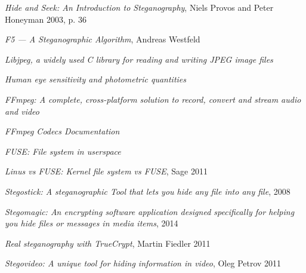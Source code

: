 \documentclass[paper=a4, fontsize=11pt,twoside]{scrartcl}
\numberwithin{table}{section}
\numberwithin{figure}{section}
\numberwithin{algorithm}{section}
\begin{document}
\begin{thebibliography}{1}
 \emph{Hide and Seek: An Introduction to Steganography}, Niels Provos and Peter Honeyman 2003, p. 36\\

 \emph{F5 — A Steganographic Algorithm}, Andreas Westfeld\\

 \emph{Libjpeg, a widely used C library for reading and writing JPEG image files}\\

 \emph{Human eye sensitivity and photometric quantities}\\

 \emph{FFmpeg: A complete, cross-platform solution to record, convert and stream audio and video}\\

 \emph{FFmpeg Codecs Documentation}\\

 \emph{FUSE: File system in userspace}\\

 \emph{Linus vs FUSE: Kernel file system vs FUSE}, Sage 2011\\

 \emph{Stegostick: A steganographic Tool that lets you hide any file into any file}, 2008\\

 \emph{Stegomagic: An encrypting software application designed specifically for helping you hide files or messages in media items}, 2014\\

 \emph{Real steganography with TrueCrypt}, Martin Fiedler 2011\\

 \emph{Stegovideo: A unique tool for hiding information in video}, Oleg Petrov 2011\\


\end{thebibliography}
\end{document}

